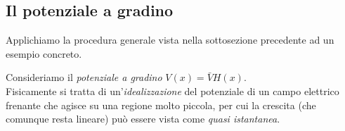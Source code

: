 \documentclass[../../FisicaTeorica.tex]{subfiles}
\begin{document}
\begin{comment}
\textbf{Commento sulle puntate precedenti}\\ %
Quando avevamo detto:
\[
\cos\left(\frac{2\pi n x}{a}\right)\xrightarrow[\mathcal{S}']{n\to\infty}0
\]
Significa precisamente:
\[
\int dx \cos\left(\frac{2\pi n x}{a}\right) \varphi(x)\xrightarrow[n\to\infty]{}0\quad \forall \varphi \in \mathcal{S}(\bb{R})
\]
(L'idea è che per $n$ molto grande, la fluttuazione è molto frequente, e quindi \textit{in media} la funzione è nulla).\\
Ciò è vero per il \textbf{teorema di\ Riemann-Lebesgue}, per cui una $f\in L'(\bb{R})$ si ha che:
\[
\int dx f(x) e^{ikx}\xrightarrow[n\to\infty]{} 0
\]
(e quindi in particolare è vero per le funzioni nello spazio di Schwartz, dato che $\mathcal{S}(\bb{R})\subset L'(\bb{R})$)
\end{comment}
\subsection{Il potenziale a gradino}
Applichiamo la procedura generale vista nella sottosezione precedente ad un esempio concreto.\\
\begin{center}

\end{center}
Consideriamo il \textit{potenziale a gradino} $V(x)=\bar{V}H(x)$.\\
Fisicamente si tratta di un'\textit{idealizzazione} del potenziale di un campo elettrico frenante che agisce su una regione molto piccola, per cui la crescita (che comunque resta lineare) può essere vista come \textit{quasi istantanea}.\\
\end{document}
